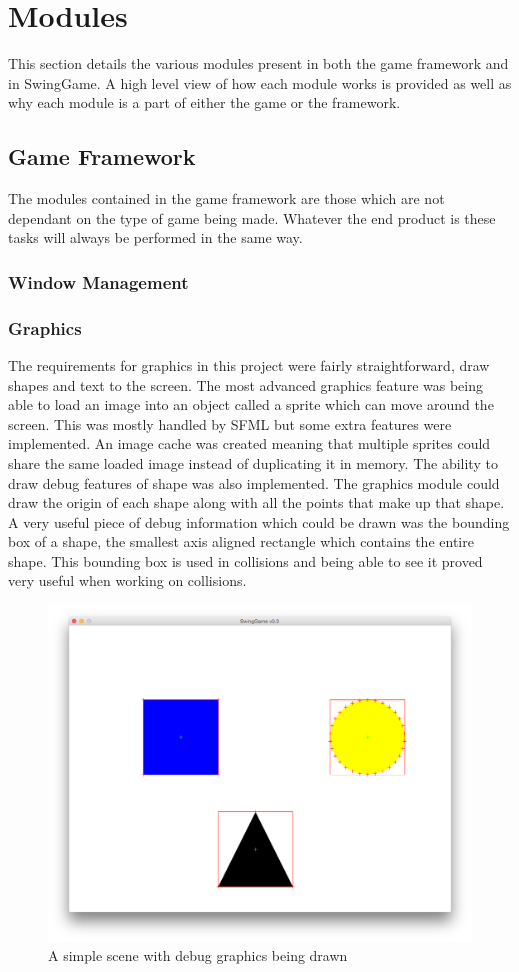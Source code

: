 \documentclass[]{report}
\begin{document}
	\section{Modules}
	This section details the various modules present in both the game framework and in SwingGame. A high level view of how each module works is provided as well as why each module is a part of either the game or the framework.
		\subsection{Game Framework}
		The modules contained in the game framework are those which are not dependant on the type of game being made. Whatever the end product is these tasks will always be performed in the same way.
			\subsubsection{Window Management}
			\subsubsection{Graphics}
			The requirements for graphics in this project were fairly straightforward, draw shapes and text to the screen. The most advanced graphics feature was being able to load an image into an object called a sprite which can move around the screen. This was mostly handled by SFML but some extra features were implemented. An image cache was created meaning that multiple sprites could share the same loaded image instead of duplicating it in memory. The ability to draw debug features of shape was also implemented. The graphics module could draw the origin of each shape along with all the points that make up that shape. A very useful piece of debug information which could be drawn was the bounding box of a shape, the smallest axis aligned rectangle which contains the entire shape. This bounding box is used in collisions and being able to see it proved very useful when working on collisions.
			\begin{figure}[h]
				\centering
				\includegraphics[scale=0.25]{debuggraphics}
				\caption{A simple scene with debug graphics being drawn}
				\label{debuggraphics}
			\end{figure}
			
\end{document}
